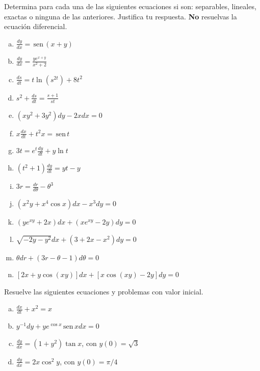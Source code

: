 \documentclass[12pt]{exam}
\renewcommand{\sin}{\,\text{sen}\,}
\begin{document}
    
    \begin{questions}
     \question%
     Determina para cada una de las siguientes ecuaciones si son: separables, lineales, exactas o ninguna de las anteriores. Justifica tu respuesta. \textbf{No} resuelvas la ecuación diferencial.
     \begin{enumerate}[a)]
         \item $\frac{dy}{dx}=\sin(x+y)$
         \item $\frac{dy}{dx}=\frac{ye^{x+y}}{x^2+2}$
         \item $\frac{ds}{dt}=t\ln(s^{2t})+8t^2$
         \item $s^2+\frac{ds}{dt}=\frac{s+1}{st}$
         \item $(xy^2+3y^2)dy-2xdx=0$
         \item $x\frac{dx}{dt}+t^2x=\sin t$
         \item $3t=e^t\frac{dy}{dt}+y\ln t$
         \item $(t^2+1)\frac{dy}{dt}=yt-y$
         \item $3r=\frac{dr}{d\theta}-\theta^3$
         \item $(x^2y+x^4\cos x)dx-x^3dy=0$
         \item $(ye^{xy}+2x)dx+(xe^{xy}-2y)dy=0$
         \item $\sqrt{-2y-y^2}dx+(3+2x-x^2)dy=0$
         \item $\theta dr+(3r-\theta-1)d\theta=0$
         \item $[2x+y\cos(xy)]dx+[x\cos(xy)-2y]dy=0$
     \end{enumerate}
    
     \question%
     Resuelve las siguientes ecuaciones y problemas con valor inicial.
     \begin{enumerate}[a)]
     	\item $\frac{dx}{dt}+x^2=x$
        \item $y^{-1}dy+ye^{\cos x}\sin xdx=0$
        \item $\frac{dy}{dx}=(1+y^2)\tan x$, con $y(0)=\sqrt{3}$
        \item $\frac{dy}{dx}=2x\cos^2y$, con $y(0)=\pi/4$
     \end{enumerate}


\end{questions}
\end{document}
